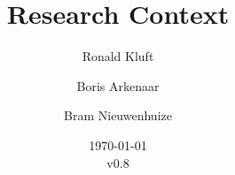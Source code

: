 \documentclass{article}
\begin{document}
 

\title{Research Context}
\author{Ronald Kluft \and Boris Arkenaar \and Bram Nieuwenhuize}
\date{\today\\v0.8}
\maketitle 





\printglossaries
\end{document}
